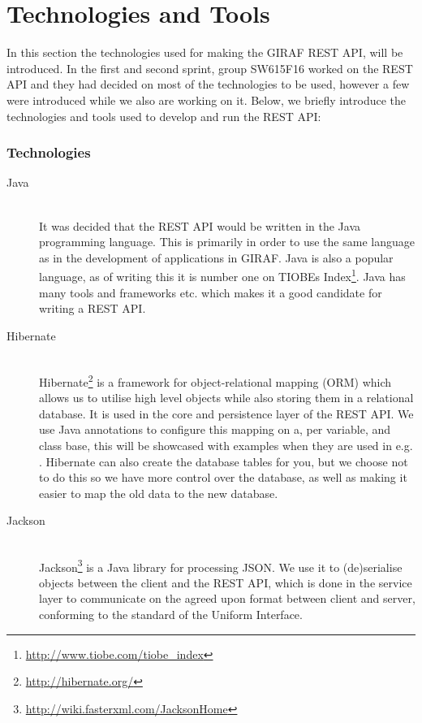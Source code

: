 \section{Technologies and Tools}\label{sec:techstack}
In this section the technologies used for making the GIRAF REST API, will be introduced.
In the first and second sprint, group SW615F16 worked on the REST API and they had decided on most of the technologies to be used, however a few were introduced while we also are working on it.
Below, we briefly introduce the technologies and tools used to develop and run the REST API:
\subsubsection{Technologies}
\begin{description}
    \item[Java] \hfill \\
        It was decided that the REST API would be written in the Java programming language.
        This is primarily in order to use the same language as in the development of applications in GIRAF.
        Java is also a popular language, as of writing this it is number one on TIOBEs Index\footnote{\url{http://www.tiobe.com/tiobe_index}}.
        Java has many tools and frameworks etc. which makes it a good candidate for writing a REST API.

    \item[Hibernate] \hfill \\
        Hibernate\footnote{\url{http://hibernate.org/}} is a framework for object-relational mapping (ORM) which allows us to utilise high level objects while also storing them in a relational database.
        It is used in the core and persistence layer of the REST API.
        We use Java annotations to configure this mapping on a, per variable, and class base, this will be showcased with examples when they are used in e.g. .
        Hibernate can also create the database tables for you, but we choose not to do this so we have more control over the database, as well as making it easier to map the old data to the new database.

    \item[Jackson] \hfill \\
        Jackson\footnote{\url{http://wiki.fasterxml.com/JacksonHome}} is a Java library for processing JSON.
        We use it to (de)serialise objects between the client and the REST API, which is done in the service layer to communicate on the agreed upon format between client and server, conforming to the standard of the Uniform Interface.


\end{description}
